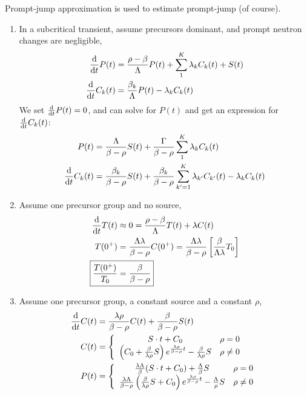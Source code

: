 \documentclass{school-22.211-notes}
\begin{document}
\clearpage
{}
Prompt-jump approximation is used to estimate prompt-jump (of course). 
\begin{enumerate}
\item In a subcritical transient, assume precursors dominant, and prompt neutron changes are negligible, 
\begin{align}
\frac{\mathrm{d}}{\mathrm{d}t} P(t) &= \frac{\rho - \beta}{\Lambda} P(t) + \displaystyle\sum_1^K \lambda_k C_k(t) + S (t) \\
\frac{\mathrm{d}}{\mathrm{d}t} C_k(t) &= \frac{\beta_k}{\Lambda} P(t) - \lambda_k C_k(t) 
\end{align}
We set $\frac{\mathrm{d}}{\mathrm{d}t} P(t) = 0$, and can solve for $P(t)$ and get an expression for $\frac{\mathrm{d}}{\mathrm{d}t} C_k(t)$: 
\begin{align}
P(t) &= \frac{\Lambda}{\beta -\rho} S(t) + \frac{\Gamma}{\beta -\rho} \displaystyle\sum_1^K \lambda_k C_k (t) \\
\frac{\mathrm{d}}{\mathrm{d}t} C_k (t) &= \frac{\beta_k}{\beta - \rho} S(t) + \frac{\beta_k}{\beta - \rho} \displaystyle\sum_{k'=1}^K \lambda_{k'} C_{k'} (t) - \lambda_k C_k (t)
\end{align}


\item Assume one precursor group and no source, 
\begin{align}
\ddt T(t) &\approx 0 = \frac{\rho - \beta}{\Lambda} T(t) + \lambda C(t) \\
T(0^+) &= \frac{\Lambda \lambda}{\beta - \rho} C(0^+) = \frac{\Lambda \lambda}{\beta - \rho} \left[ \frac{\beta}{\Lambda \lambda} T_0 \right] \\
\Aboxed{ \frac{T(0^+)}{T_0} &= \frac{\beta}{\beta - \rho} }
\end{align}


\item Assume one precursor group, a constant source and a constant $\rho$, 
\begin{align}
\frac{\mathrm{d}}{\mathrm{d}t} C(t) &= \frac{\lambda \rho}{\beta - \rho} C(t) + \frac{\beta}{\beta - \rho} S (t) \\
C(t) &= \left\{
\begin{array}{cc}
S \cdot t + C_0 & \rho = 0 \\
\left( C_0 + \frac{\beta}{\lambda \rho} S \right) e^{\frac{\lambda \rho}{\beta - \rho} t} - \frac{\beta}{\lambda \rho} S &  \rho \neq 0 
\end{array}  \right.  \\
P(t) &= \left\{ 
\begin{array}{cc}
\frac{\lambda \Lambda}{\beta} (S \cdot t + C_0) + \frac{\Lambda}{\beta} S & \rho = 0 \\
\frac{\lambda \Lambda}{\beta - \rho} \left( \frac{\beta}{\lambda \rho} S + C_0 \right) e^{ \frac{\lambda \rho}{\beta - \rho} t} - \frac{\Lambda}{\rho} S & \rho \neq 0
\end{array} \right. 
\end{align}



\end{enumerate}
\end{document}
